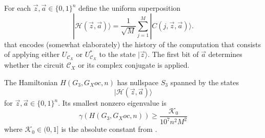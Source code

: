 \documentclass[../thesis-main/thesis-main]{subfiles}
\begin{document}
For each $\vec{z},\vec{a}\in\{0,1\}^{n}$ define the uniform superposition
\begin{equation}
  |\mathcal{H}(\vec{z},\vec{a})\rangle
  =\frac{1}{\sqrt{M}}\sum_{j=1}^{M}|C\left(j,\vec{z},\vec{a}\right)\rangle.
\end{equation}
that encodes (somewhat elaborately) the history of the computation that consists of applying either $U_{\mathcal{C}_X}$ or $U_{\mathcal{C}_X}^{*}$ to the state $|\vec{z}\rangle$. The first bit of $\vec{a}$ determines whether the circuit $\mathcal{C}_{X}$ or its complex conjugate is applied. 

\begin{lemma}
\label{lem:HG3}
The Hamiltonian $H(G_{3},G_Xoc,n)$ has nullspace $S_3$ spanned by the states
\begin{equation}
  |\mathcal{H}(\vec{z},\vec{a})\rangle
\end{equation}
for $\vec{z},\vec{a}\in\{0,1\}^{n}$. Its smallest nonzero eigenvalue is 
\begin{equation}
  \gamma(H(G_{3},G_Xoc,n)) \geq \frac{\mathcal{K}_0}{10^7 n^{2}M^{2}}
\end{equation}
where $\mathcal{K}_0\in (0,1]$ is the absolute constant from .
\end{lemma}
\end{document}
